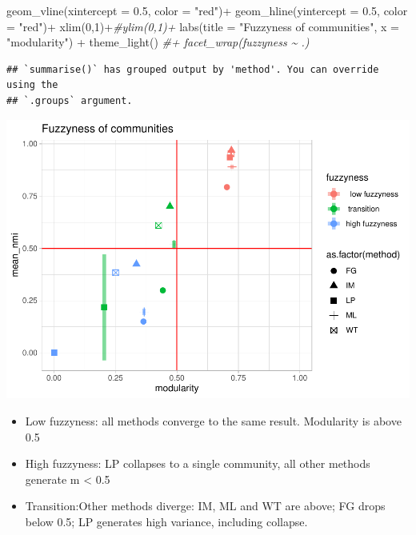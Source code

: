 \documentclass[
]{article}
\newenvironment{Shaded}{\begin{snugshade}}{\end{snugshade}}
\newcommand{\AttributeTok}[1]{\textcolor[rgb]{0.77,0.63,0.00}{#1}}
\newcommand{\CommentTok}[1]{\textcolor[rgb]{0.56,0.35,0.01}{\textit{#1}}}
\newcommand{\DecValTok}[1]{\textcolor[rgb]{0.00,0.00,0.81}{#1}}
\newcommand{\FloatTok}[1]{\textcolor[rgb]{0.00,0.00,0.81}{#1}}
\newcommand{\FunctionTok}[1]{\textcolor[rgb]{0.00,0.00,0.00}{#1}}
\newcommand{\NormalTok}[1]{#1}
\newcommand{\SpecialCharTok}[1]{\textcolor[rgb]{0.00,0.00,0.00}{#1}}
\newcommand{\StringTok}[1]{\textcolor[rgb]{0.31,0.60,0.02}{#1}}
\providecommand{\tightlist}{%
  \setlength{\itemsep}{0pt}\setlength{\parskip}{0pt}}
\begin{document}
\begin{Shaded}
\begin{Highlighting}[]
  \FunctionTok{geom\_vline}\NormalTok{(}\AttributeTok{xintercept =} \FloatTok{0.5}\NormalTok{, }\AttributeTok{color =} \StringTok{"red"}\NormalTok{)}\SpecialCharTok{+}
  \FunctionTok{geom\_hline}\NormalTok{(}\AttributeTok{yintercept =} \FloatTok{0.5}\NormalTok{, }\AttributeTok{color =} \StringTok{"red"}\NormalTok{)}\SpecialCharTok{+}
  \FunctionTok{xlim}\NormalTok{(}\DecValTok{0}\NormalTok{,}\DecValTok{1}\NormalTok{)}\SpecialCharTok{+}\CommentTok{\#ylim(0,1)+}
  \FunctionTok{labs}\NormalTok{(}\AttributeTok{title =} \StringTok{"Fuzzyness of communities"}\NormalTok{, }\AttributeTok{x =} \StringTok{"modularity"}\NormalTok{) }\SpecialCharTok{+}
  \FunctionTok{theme\_light}\NormalTok{()  }\CommentTok{\#+ facet\_wrap(fuzzyness \textasciitilde{} .)}
\end{Highlighting}
\end{Shaded}

\begin{verbatim}
## `summarise()` has grouped output by 'method'. You can override using the
## `.groups` argument.
\end{verbatim}

\includegraphics{com_det_algorithms_files/figure-latex/unnamed-chunk-20-1.pdf}

\begin{itemize}
\tightlist
\item
  Low fuzzyness: all methods converge to the same result. Modularity is
  above 0.5
\item
  High fuzzyness: LP collapses to a single community, all other methods
  generate m \textless{} 0.5
\item
  Transition:Other methods diverge: IM, ML and WT are above; FG drops
  below 0.5; LP generates high variance, including collapse.
\end{itemize}
\end{document}
